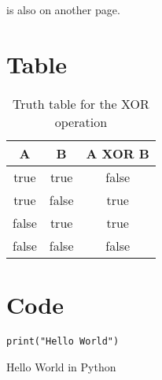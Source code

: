  is also on another page.

\section{Table}
\label{sec:table}

\begin{table}[H]
    \centering
    \begin{tabular}{| c | c | c |}
        \hline
        A & B & A XOR B \\
        \hline\hline
        true  & true  & false \\
        true  & false & true  \\
        false & true  & true  \\
        false & false & false \\
        \hline
    \end{tabular}
    \caption{Truth table for the XOR operation}
    \label{tab:xor_truth_table}
\end{table}

\section{Code}
\label{sec:code}

\begin{listing}[H]
    \begin{verbatim}
print("Hello World")
    \end{verbatim}
    \caption{Hello World in Python}
    \label{lst:python_hello_world}
\end{listing}